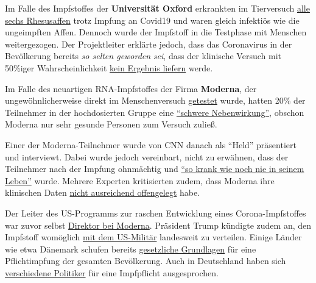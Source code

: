 Im Falle des Impfstoffes der \textbf{Universität Oxford} erkrankten im
Tierversuch
\href{https://www.dailymail.co.uk/sciencetech/article-8331709/Oxford-coronavirus-vaccine-does-not-stop-infection-experts-warn.html}{alle
sechs Rhesusaffen} trotz Impfung an Covid19 und waren gleich infektiös
wie die ungeimpften Affen. Dennoch wurde der Impfstoff in die Testphase
mit Menschen weitergezogen. Der Projektleiter erklärte jedoch, dass das
Coronavirus in der Bevölkerung bereits \emph{so selten geworden}
\emph{sei}, dass der klinische Versuch mit 50\%iger Wahrscheinlichkeit
\href{https://www.telegraph.co.uk/news/2020/05/23/oxford-university-covid-19-vaccine-trial-has-50-per-cent-chance/}{kein
Ergebnis liefern} werde.

Im Falle des neuartigen RNA-Impfstoffes der Firma \textbf{Moderna}, der
ungewöhnlicherweise direkt im Menschenversuch
\href{https://www.statnews.com/2020/03/11/researchers-rush-to-start-moderna-coronavirus-vaccine-trial-without-usual-animal-testing/}{getestet}
wurde, hatten 20\% der Teilnehmer in der hochdosierten Gruppe eine
\href{https://childrenshealthdefense.org/news/vaccine-trial-catastrophe-moderna-vaccine-has-20-serious-injury-rate-in-high-dose-group/}{``schwere
Nebenwirkung''}, obschon Moderna nur sehr gesunde Personen zum Versuch
zuließ.

Einer der Moderna-Teilnehmer wurde von CNN danach als ``Held''
präsentiert und interviewt. Dabei wurde jedoch vereinbart, nicht zu
erwähnen, dass der Teilnehmer nach der Impfung ohnmächtig und
\href{https://childrenshealthdefense.org/news/modernas-guinea-pig-sickest-in-his-life-after-being-injected-with-experimental-vaccine/}{``so
krank wie noch nie in seinem Leben''} wurde. Mehrere Experten
kritisierten zudem, dass Moderna ihre klinischen Daten
\href{https://www.statnews.com/2020/05/19/vaccine-experts-say-moderna-didnt-produce-data-critical-to-assessing-covid-19-vaccine/}{nicht
ausreichend offengelegt} habe.

Der Leiter des US-Programms zur raschen Entwicklung eines
Corona-Impfstoffes war zuvor selbst
\href{https://www.businessinsider.com/moncef-slaoui-leading-trump-vaccine-push-10m-holding-moderna-conflict-2020-5}{Direktor
bei Moderna}. Präsident Trump kündigte zudem an, den Impfstoff womöglich
\href{https://www.msn.com/en-us/news/politics/trump-says-hes-mobilizing-military-to-distribute-potential-coronavirus-vaccine/ar-BB1463uZ}{mit
dem US-Militär} landesweit zu verteilen. Einige Länder wie etwa Dänemark
schufen bereits
\href{https://www.thelocal.dk/20200313/denmark-passes-far-reaching-emergency-coronavirus-law}{gesetzliche
Grundlagen} für eine Pflichtimpfung der gesamten Bevölkerung. Auch in
Deutschland haben sich
\href{https://www.swp.de/panorama/corona-impfpflicht-wird-die-impfung-bald-zur-vorschrift-in-deutschland_-das-ist-der-momentane-stand-45785279.html}{verschiedene
Politiker} für eine Impfpflicht ausgesprochen.

